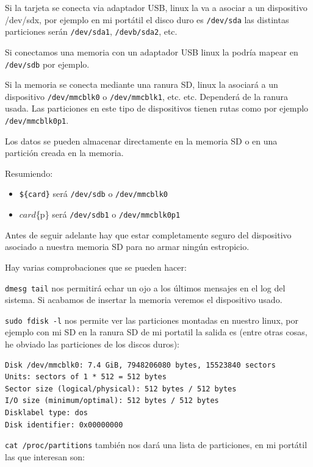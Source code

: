 \documentclass[12pt,spanish,]{article}
\providecommand{\tightlist}{%
  \setlength{\itemsep}{0pt}\setlength{\parskip}{0pt}}
\begin{document}
Si la tarjeta se conecta via adaptador USB, linux la va a asociar a un
dispositivo /dev/sdx, por ejemplo en mi portátil el disco duro es
\texttt{/dev/sda} las distintas particiones serán \texttt{/dev/sda1},
\texttt{/devb/sda2}, etc.

Si conectamos una memoria con un adaptador USB linux la podría mapear en
\texttt{/dev/sdb} por ejemplo.

Si la memoria se conecta mediante una ranura SD, linux la asociará a un
dispositivo \texttt{/dev/mmcblk0} o \texttt{/dev/mmcblk1}, etc. etc.
Dependerá de la ranura usada. Las particiones en este tipo de
dispositivos tienen rutas como por ejemplo \texttt{/dev/mmcblk0p1}.

Los datos se pueden almacenar directamente en la memoria SD o en una
partición creada en la memoria.

Resumiendo:

\begin{itemize}
\tightlist
\item
  \texttt{\$\{card\}} será \texttt{/dev/sdb} o \texttt{/dev/mmcblk0}
\item
  \({card}\)\{p\} será \texttt{/dev/sdb1} o \texttt{/dev/mmcblk0p1}
\end{itemize}

Antes de seguir adelante hay que estar completamente seguro del
dispositivo asociado a nuestra memoria SD para no armar ningún
estropicio.

Hay varias comprobaciones que se pueden hacer:

\texttt{dmesg\ \textbar{}tail} nos permitirá echar un ojo a los últimos
mensajes en el log del sistema. Si acabamos de insertar la memoria
veremos el dispositivo usado.

\texttt{sudo\ fdisk\ -l} nos permite ver las particiones montadas en
nuestro linux, por ejemplo con mi SD en la ranura SD de mi portatil la
salida es (entre otras cosas, he obviado las particiones de los discos
duros):

\begin{verbatim}
Disk /dev/mmcblk0: 7.4 GiB, 7948206080 bytes, 15523840 sectors
Units: sectors of 1 * 512 = 512 bytes
Sector size (logical/physical): 512 bytes / 512 bytes
I/O size (minimum/optimal): 512 bytes / 512 bytes
Disklabel type: dos
Disk identifier: 0x00000000
\end{verbatim}

\texttt{cat\ /proc/partitions} también nos dará una lista de
particiones, en mi portátil las que interesan son:
\end{document}
